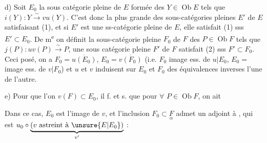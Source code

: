 
d)  Soit $E_0$ \deleted{\unsure{=}} la sous catégorie  pleine de $E$ formée des $Y\in\operatorname{Ob}E$ tels que $i(Y):Y\xrightarrow{\sim}vu(Y)$. C'est donc la plus grande des sous-catégories pleines $E'$ de $E$ satisfaisant (1), et si $E'$ est une ss-catégorie pleine de $E$, elle satisfait (1) sss $E'\subset E_0$. De m\textsuperscript{e} on définit la sous-catégorie  pleine $F_0$ de $F$  des  $P\in\operatorname{Ob}F$ tels que $j(P):uv(P)\xrightarrow{\sim}P$, une sous catégorie pleine $F'$ de $F$ satisfait (2) sss $F'\subset F_0$. Ceci posé, on a $F_0=\overline{u(E_0)}$, $E_0=\overline{v(F_0)}$ (i.e. $F_0$\inserted{$=$} image ess. de $u|E_0$, $E_0=$ image ess. de $v|F_0$) et $u$ et $v$ induisent sur $E_0$ et $F_0$ des équivalences inverses l'une de l'autre.

e) Pour que  l'on  $v(F)\subset E_0$, il f. et s. que pour $\forall$  $P\in\operatorname{Ob}F$, on ait 




Dans ce cas, $E_0$ est l'image  de $v$, et l'inclusion $F_0\subset\underset{\alpha}{F}$ admet un adjoint à , qui est  $u_0\circ\underbrace{(v\ \text{astreint à }\unsure{E|E_0})}_{v'}$ :

